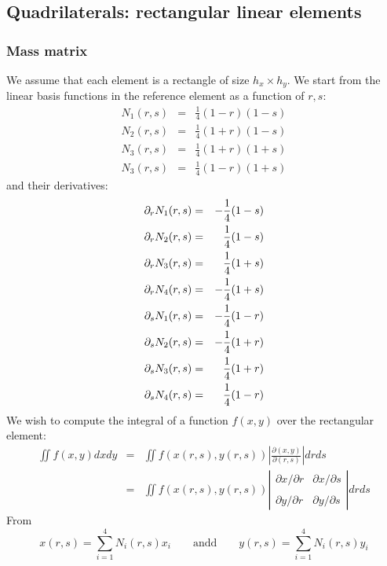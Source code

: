 \subsection{Quadrilaterals: rectangular linear elements} \label{app:qrle}

\subsubsection{Mass matrix}

We assume that each element is a rectangle of size $h_x \times h_y$. 
We start from the linear basis functions in the reference element as a function of $r,s$:
\begin{eqnarray}
N_1(r,s) &=& \frac{1}{4}(1-r)(1-s) \\ 
N_2(r,s) &=& \frac{1}{4}(1+r)(1-s) \\ 
N_3(r,s) &=& \frac{1}{4}(1+r)(1+s) \\ 
N_3(r,s) &=& \frac{1}{4}(1-r)(1+s) 
\end{eqnarray}
and their derivatives:
\begin{eqnarray}
\partial_r N_1(r,s) &=& -\frac{1}{4}(1-s) \nonumber\\
\partial_r N_2(r,s) &=& \frac{1}{4}(1-s) \nonumber\\
\partial_r N_3(r,s) &=& \frac{1}{4}(1+s) \nonumber\\
\partial_r N_4(r,s) &=& -\frac{1}{4}(1+s) \nonumber\\
\partial_s N_1(r,s) &=& -\frac{1}{4}(1-r) \nonumber\\
\partial_s N_2(r,s) &=& -\frac{1}{4}(1+r) \nonumber\\
\partial_s N_3(r,s) &=& \frac{1}{4}(1+r) \nonumber\\
\partial_s N_4(r,s) &=& \frac{1}{4}(1-r) \nonumber
\end{eqnarray}
We wish to compute the integral of a function $f(x,y)$ over the rectangular element:
\begin{eqnarray}
\iint f(x,y) dx dy 
&=& \iint f(x(r,s),y(r,s)) \left| \frac{\partial (x,y)}{\partial (r,s) } \right|  dr ds \\
&=& \iint f(x(r,s),y(r,s)) 
\left| 
\begin{array}{cc}
\partial x/\partial r & \partial x/\partial s \\ \\
\partial y/\partial r & \partial y/\partial s 
\end{array}
\right|  dr ds 
\end{eqnarray}
From 
\[
x(r,s)=\sum_{i=1}^4 N_i(r,s) x_i 
\qquad \text{andd} \qquad 
y(r,s)=\sum_{i=1}^4 N_i(r,s) y_i 
\]
